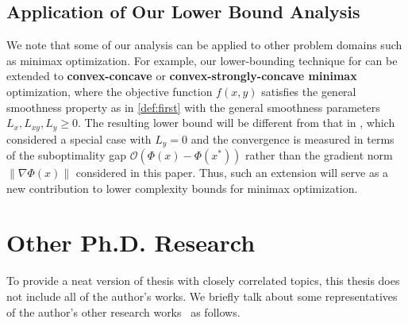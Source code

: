 \documentclass{osudissert96}
\begin{document}
 

\subsection*{Application of Our Lower Bound Analysis}
We note that some of our analysis can be applied to other problem domains such as minimax optimization. For example, our lower-bounding technique for  can be extended to {\bf convex-concave} or {\bf convex-strongly-concave minimax} optimization, where the objective function $f(x,y)$ satisfies the general smoothness property as in \cref{def:first} with the general smoothness parameters $L_x,L_{xy}, L_y\geq 0$. The resulting lower bound will be different from that in \cite{ouyang2019lower}, which considered a special case with $L_y=0$ and the convergence is measured in terms of the suboptimality gap $\mathcal{O}(\Phi(x)-\Phi(x^*))$ rather than the gradient norm $\|\nabla\Phi(x)\|$ considered in this paper. Thus, such an extension will serve as a new contribution to lower complexity bounds for minimax optimization. 


\section{Other Ph.D. Research}
To provide a neat version of thesis with closely correlated topics, this thesis does not include all of the author's works. We briefly talk about some representatives of the author's other research works~\cite{ji2018minimax,ji2021understanding,ji2020learning,wang2019spiderboost,ji2019improved,ji2020history,xu2021will,quan2018lru,tan2018resource,guan2020robust,zhang2020improving,zhang2020boosting,zhou2020proximal} as follows. 
\end{document}
